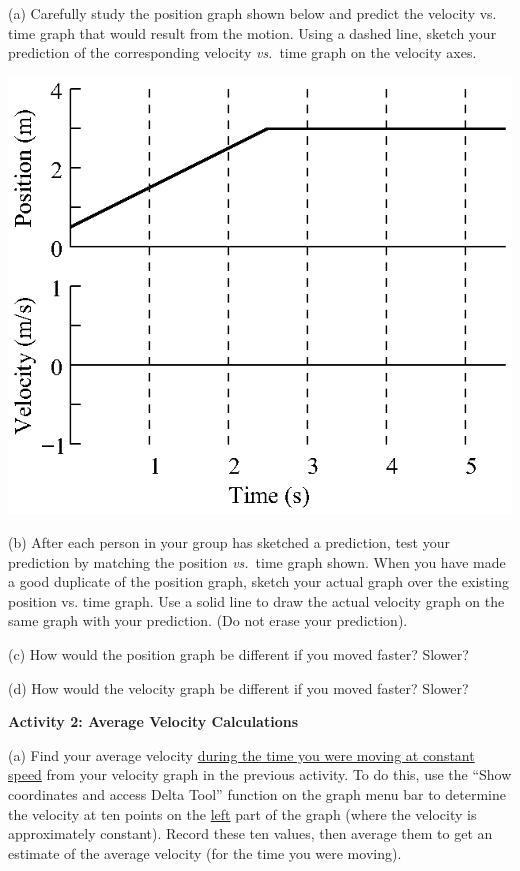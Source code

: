 (a) Carefully study the position graph shown below and predict the velocity
vs. time graph that would result from the motion. Using a dashed line, sketch
your prediction of the corresponding velocity \textit{vs.}~time graph on the velocity
axes.

\vspace{0.3cm}
{\par\centering \includegraphics{relating/relating_fig1.eps} \par}
\vspace{0.3cm}

(b) After each person in your group has sketched a prediction, test your prediction
by matching the position \textit{vs.}~time graph shown. When you have made a good duplicate
of the position graph, sketch your actual graph over the existing position vs. time graph.
Use a solid line to draw the actual velocity graph on the same graph with
your prediction. (Do not erase your prediction).

(c) How would the position graph be different if you moved faster? Slower? 
\answerspace{15mm}

(d) How would the velocity graph be different if you moved faster? Slower? 
\answerspace{15mm}

\textbf{Activity 2: Average Velocity Calculations} 

(a) Find your average velocity \underline{during the time you were moving at constant speed} from your velocity graph in the previous activity. To do this, use the ``Show coordinates and access Delta Tool'' function on the graph menu bar to determine the velocity at ten points on the \underline{left} part of the graph (where the velocity is approximately constant). Record these ten values, then average them to get an estimate of the average velocity (for the time you were moving).

